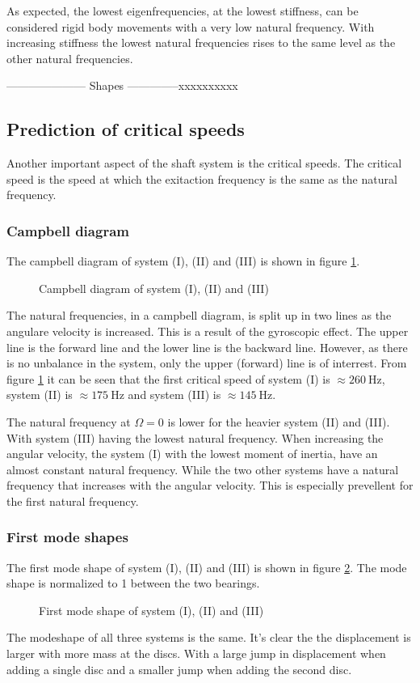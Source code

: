 As expected, the lowest eigenfrequencies, at the lowest stiffness, can be considered rigid body movements with a very low natural frequency. With increasing stiffness the lowest natural frequencies rises to the same level as the other natural frequencies.

--------------------- Shapes --------------xxxxxxxxxx

\subsection{Prediction of critical speeds}
Another important aspect of the shaft system is the critical speeds. The critical speed is the speed at which the exitaction frequency is the same as the natural frequency.

\subsubsection{Campbell diagram}
The campbell diagram of system (I), (II) and (III) is shown in figure \ref{fig:campbell_diagram}.
\begin{figure}[htbp]
    \centering
    
    \caption{Campbell diagram of system (I), (II) and (III)}
    \label{fig:campbell_diagram}
\end{figure}
The natural frequencies, in a campbell diagram, is split up in two lines as the angulare velocity is increased. This is a result of the gyroscopic effect. The upper line is the forward line and the lower line is the backward line. However, as there is no unbalance in the system, only the upper (forward) line is of interrest. From figure \ref{fig:campbell_diagram} it can be seen that the first critical speed of system (I) is $\approx \SI{260}{\hertz}$, system (II) is $\approx \SI{175}{\hertz}$ and system (III) is $\approx \SI{145}{\hertz}$.

The natural frequency at $\Omega = 0$ is lower for the heavier system (II) and (III). With system (III) having the lowest natural frequency. When increasing the angular velocity, the system (I) with the lowest moment of inertia, have an almost constant natural frequency. While the two other systems have a natural frequency that increases with the angular velocity. This is especially prevellent for the first natural frequency.

\subsubsection{First mode shapes}
The first mode shape of system (I), (II) and (III) is shown in figure \ref{fig:first_mode_shape}. The mode shape is normalized to 1 between the two bearings.
\begin{figure}[htbp]
    \centering
    
    \caption{First mode shape of system (I), (II) and (III)}
    \label{fig:first_mode_shape}
\end{figure}
The modeshape of all three systems is the same. It's clear the the displacement is larger with more mass at the discs. With a large jump in displacement when adding a single disc and a smaller jump when adding the second disc.

